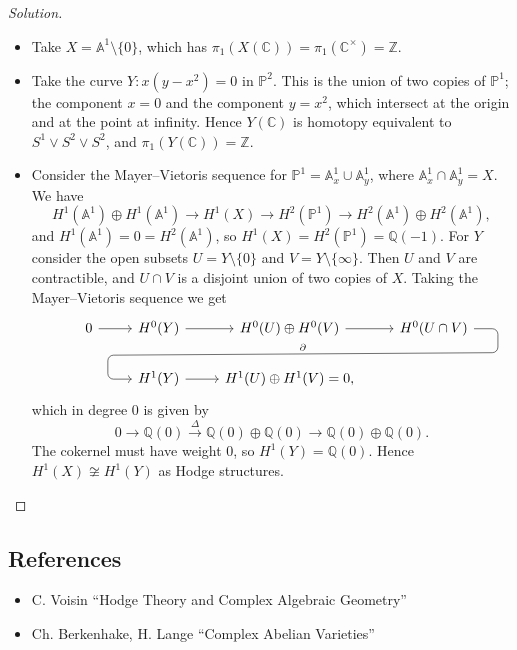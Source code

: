 \documentclass{article}
\theoremstyle{definition}
\renewcommand{\P}{\mathbb{P}}
\newcommand{\A}{\mathbb{A}}
\newcommand{\Z}{\mathbb{Z}}
\newcommand{\Q}{\mathbb{Q}}
\newcommand{\C}{\mathbb{C}}
\begin{document}
\begin{proof}[Solution]
    \begin{itemize}
        \item Take $X=\A^1\setminus\{0\}$, which has
            $\pi_1(X(\C))=\pi_1(\C^\times)=\Z$.


        \item Take the curve $Y:x(y-x^2)=0$ in $\P^2$. This is the union of two
            copies of $\P^1$; the component $x=0$ and the component $y=x^2$,
            which intersect at the origin and at the point at infinity. Hence
            $Y(\C)$ is homotopy equivalent to $S^1\vee S^2\vee S^2$, and
            $\pi_1(Y(\C))=\Z$.

        \item Consider the Mayer--Vietoris sequence for $\P^1=\A^1_x\cup\A^1_y$,
            where $\A^1_x\cap\A^1_y=X$. We have
            \begin{equation*}
                H^1(\A^1)\oplus H^1(\A^1) \to
                H^1(X) \to
                H^2(\P^1) \to
                H^2(\A^1)\oplus H^2(\A^1),
            \end{equation*}
            and $H^1(\A^1)=0=H^2(\A^1)$, so $H^1(X)=H^2(\P^1)=\Q(-1)$. For $Y$
            consider the open subsets $U=Y\setminus\{0\}$ and
            $V=Y\setminus\{\infty\}$. Then $U$ and $V$ are contractible, and
            $U\cap V$ is a disjoint union of two copies of $X$. Taking the
            Mayer--Vietoris sequence we get
            \begin{equation*}
                \begin{tikzcd}
                    &0 \ar[r] &H^0(Y) \ar[r]
                    &H^0(U)\oplus H^0(V) \ar[r]
                    &H^0(U\cap V)
                        \ar[sloped,rounded corners,dll,"\partial",to path={
                            -| ([yshift=-.6cm,xshift=.6cm]\tikztostart.east)
                            -- ([yshift=.6cm,xshift=-.6cm]\tikztotarget.west)
                            \tikztonodes
                            |- (\tikztotarget)
                        }] \\
                    & &H^1(Y) \ar[r]
                    &H^1(U)\oplus H^1(V)=0,
                \end{tikzcd}
            \end{equation*}
            which in degree 0 is given by
            \begin{equation*}
                0\to\Q(0)\xrightarrow\Delta\Q(0)\oplus\Q(0)\to\Q(0)\oplus\Q(0).
            \end{equation*}
            The cokernel must have weight 0, so $H^1(Y)=\Q(0)$. Hence
            $H^1(X)\not\cong H^1(Y)$ as Hodge structures.
    \end{itemize}
\end{proof}

\subsection*{References}

\begin{itemize}
    \item C. Voisin ``Hodge Theory and Complex Algebraic Geometry''
    \item Ch. Berkenhake, H. Lange ``Complex Abelian Varieties''
\end{itemize}
\end{document}
